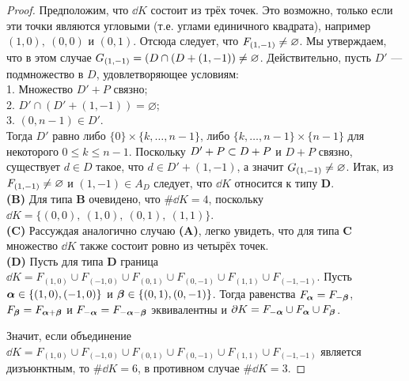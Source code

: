 \begin{proof}
Предположим, что $\dd K$ состоит из трёх точек.
Это возможно, только если эти точки являются угловыми (т.е. углами единичного квадрата), например $(1,0),\ (0,0)$ и $(0,1)$.
Отсюда следует, что $F_{(1,-1)}\neq\varnothing$.
Мы утверждаем, что в этом случае $G_{(1,-1)}=(D\cap (D+(1,-1))\neq\varnothing$.
Действительно, пусть $D'$ --- подмножество в $D$, удовлетворяющее условиям:\\
1. Множество $D'+P$ связно;\\
2. $D'\cap (D'+(1,-1))=\varnothing$;\\
3. $(0,n-1)\in D'$. \\
Тогда $D'$ равно либо $\{0\}\times\{k,\ldots,n-1\}$, либо $\{k,\ldots,n-1\}\times\{n-1\}$ для некоторого $0\leq k\leq n-1$.
Поскольку $D'+P\subset D+P$ и $D+P$ связно, существует $d\in D$ такое, что $d\in D'+(1,-1)$, а значит $G_{(1,-1)}\neq\varnothing$.
Итак, из $F_{(1,-1)}\neq\varnothing$ и $(1,-1)\in A_D$ следует, что $\dd K$ относится к типу {\bf D}. \\

{\bf (B)} Для типа {\bf B} очевидено, что $\#\dd K=4$, поскольку $\dd K=\{(0,0),\ (1,0),\ (0,1),\ (1,1)\}$.\\

{\bf (C)} Рассуждая аналогично случаю {\bf (A)}, легко увидеть, что для типа {\bf C} множество $\dd K$ также состоит ровно из четырёх точек. \\

{\bf (D)} Пусть для типа {\bf D} граница $\dd K=F_{(1,0)}\cup F_{(-1,0)}\cup F_{(0,1)}\cup F_{(0,-1)}\cup F_{(1,1)}\cup F_{(-1,-1)}$.
Пусть ${\bm{\alpha}}\in\{(1,0),(-1,0)\}$ и ${\bm{\beta}}\in\{(0,1),(0,-1)\}$.
Тогда равенства $F_{\bm{\alpha}}=F_{-{\bm{\beta}}}$, $F_{{\bm{\beta}}}=F_{{\bm{\alpha}}+{\bm{\beta}}}$ и $F_{-{\bm{\alpha}}}=F_{-{\bm{\alpha}}-{\bm{\beta}}}$ эквивалентны и $\partial K=F_{-{\bm{\alpha}}}\cup F_{\bm{\alpha}}\cup F_{\bm{\beta}}$. 

Значит, если объединение $\dd K=F_{(1,0)}\cup F_{(-1,0)}\cup F_{(0,1)}\cup F_{(0,-1)}\cup F_{(1,1)}\cup F_{(-1,-1)}$ является дизъюнктным, то $\#\dd K=6$, в противном случае $\#\dd K=3$.
\end{proof}





